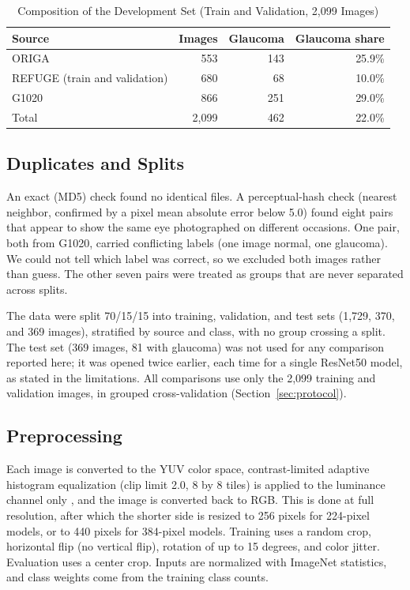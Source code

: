 \begin{table}[!t]
\caption{Composition of the Development Set (Train and Validation, 2,099 Images)}
\label{tab:data}
\centering
\footnotesize
\begin{tabular}{lrrr}
\toprule
Source & Images & Glaucoma & Glaucoma share \\
\midrule
ORIGA & 553 & 143 & 25.9\% \\
REFUGE (train and validation) & 680 & 68 & 10.0\% \\
G1020 & 866 & 251 & 29.0\% \\
Total & 2,099 & 462 & 22.0\% \\
\bottomrule
\end{tabular}
\end{table}

\subsection{Duplicates and Splits}
An exact (MD5) check found no identical files. A perceptual-hash check (nearest neighbor, confirmed by a pixel mean absolute error below 5.0) found eight pairs that appear to show the same eye photographed on different occasions. One pair, both from G1020, carried conflicting labels (one image normal, one glaucoma). We could not tell which label was correct, so we excluded both images rather than guess. The other seven pairs were treated as groups that are never separated across splits.

The data were split 70/15/15 into training, validation, and test sets (1,729, 370, and 369 images), stratified by source and class, with no group crossing a split. The test set (369 images, 81 with glaucoma) was not used for any comparison reported here; it was opened twice earlier, each time for a single ResNet50 model, as stated in the limitations. All comparisons use only the 2,099 training and validation images, in grouped cross-validation (Section~\ref{sec:protocol}).

\subsection{Preprocessing}
Each image is converted to the YUV color space, contrast-limited adaptive histogram equalization (clip limit 2.0, 8 by 8 tiles) is applied to the luminance channel only \cite{zuiderveld1994}, and the image is converted back to RGB. This is done at full resolution, after which the shorter side is resized to 256 pixels for 224-pixel models, or to 440 pixels for 384-pixel models. Training uses a random crop, horizontal flip (no vertical flip), rotation of up to 15 degrees, and color jitter. Evaluation uses a center crop. Inputs are normalized with ImageNet statistics, and class weights come from the training class counts.

